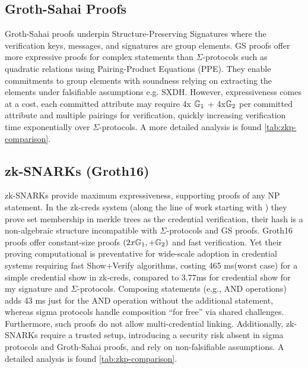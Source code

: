 \subsection{Groth-Sahai Proofs}
Groth-Sahai \cite{smart_efficient_2008,krawczyk_fine-tuning_2014} proofs underpin Structure-Preserving Signatures \cite{kiltz_structure-preserving_2015, fuchsbauer_structure-preserving_2019, hanaoka_improved_2022, steinfeld_threshold_2023} where the verification keys, messages, and signatures are group elements. GS proofs offer more expressive proofs for complex statements than $\Sigma$-protocols such as quadratic relations using Pairing-Product Equations (PPE). They enable commitments to group elements with soundness relying on extracting the elements under falsifiable assumptions e.g. SXDH. However, expressiveness comes at a cost, each committed attribute may require 4x $\mathbb{G}_1$ + 4x$\mathbb{G}_2$ per committed attribute \cite{kiltz_structure-preserving_2015, sedaghat_groth-sahai_2023} and multiple pairings for verification, quickly increasing verification time exponentially over $\Sigma$-protocols. A more detailed analysis is found \ref{tab:zkp-comparison}. 

\subsection{zk-SNARKs (Groth16)}
zk-SNARKs provide maximum expressiveness, supporting proofs of any NP statement. In the zk-creds system \cite{rosenberg_zk-creds_2022} (along the line of work starting with \cite{garman_decentralized_2014} ) they prove set membership in merkle trees as the credential verification, their hash is a non-algebraic structure incompatible with $\Sigma$-protocols and GS proofs. Groth16 \cite{fischlin_size_2016} proofs offer constant-size proofs $(2x \mathbb{G}_1, + \mathbb{G}_2)$ and fast verification. Yet their proving computational is preventative for wide-scale adoption in credential systems requiring fast Show+Verify algorithms, costing 465 ms(worst case) for a simple credential show in zk-creds, compared to 3.77ms for credential show for my signature and $\Sigma$-protocols. Composing statements (e.g., AND operations) adds 43 ms just for the AND operation without the additional statement, whereas sigma protocols handle composition “for free” via shared challenges. Furthermore, such proofs do not allow multi-credential linking. Additionally, zk-SNARKs require a trusted setup, introducing a security risk absent in sigma protocols and Groth-Sahai proofs, and rely on non-falsifiable assumptions. A detailed analysis is found \ref{tab:zkp-comparison}. 


